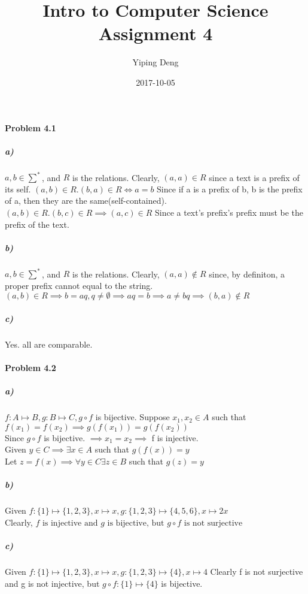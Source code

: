 \documentclass{article}
\title{Intro to Computer Science Assignment 4}
\date{2017-10-05}
\author{Yiping Deng}
\begin{document}
\maketitle
\paragraph{Problem 4.1}
\subparagraph{a)}
$a, b \in \sum^*$, and $R$ is the relations. Clearly, $(a, a) \in R$ since a text is a prefix of its self.
$(a, b) \in R . (b, a) \in R \iff a = b$ Since if a is a prefix of b, b is the prefix of a, then they are the same(self-contained).
$(a, b) \in R . (b, c) \in R \implies (a, c) \in R$ Since a text's prefix's prefix must be the prefix of the text.
\subparagraph{b)}
$a, b \in \sum^*$, and $R$ is the relations. Clearly, $(a, a) \not\in R$ since, by definiton, a proper prefix cannot equal to the string.
$(a, b) \in R \implies b = aq, q \neq \emptyset \implies aq = b \implies a \neq bq \implies (b, a) \not\in R$
\subparagraph{c)}
Yes. all are comparable.

\paragraph{Problem 4.2}
\subparagraph{a)}
$ f: A \mapsto B, g: B \mapsto C , g \circ f$ is bijective.
Suppose $  x_1, x_2 \in A$ such that $f(x_1) = f(x_2) \implies g(f(x_1)) = g(f(x_2)) $ \\
Since $g \circ f$ is bijective.
$\implies x_1 = x_2 \implies$ f is injective.\\
Given $ y \in C \implies \exists x \in A$ such that $g(f(x)) = y$ \\
Let $z = f(x) \implies \forall y \in C \exists z \in B$ such that $g(z) = y$
\subparagraph{b)}
Given $ f: \{ 1 \} \mapsto \{ 1, 2, 3 \}, x \mapsto x, g: \{ 1 ,2 ,3 \} \mapsto \{ 4, 5, 6 \}, x \mapsto 2x $\\
Clearly, $f \text{ is injective and } g \text{ is bijective, but } g \circ f \text{ is not surjective}$

\subparagraph{c)}
Given $f: \{ 1 \} \mapsto \{ 1, 2, 3 \}, x \mapsto x, g: \{ 1 ,2 ,3 \} \mapsto \{ 4 \}, x \mapsto 4$
Clearly f is not surjective and g is not injective, but $g \circ f: \{ 1 \} \mapsto \{ 4 \}$ is bijective.
\end{document}
